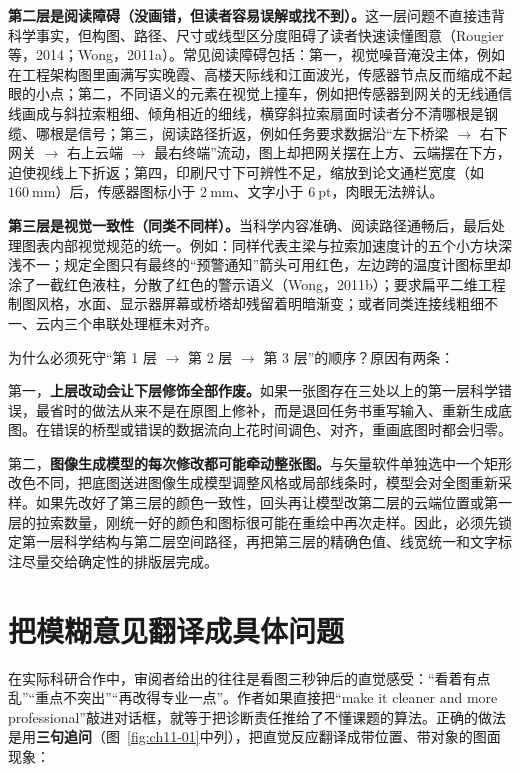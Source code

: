 \textbf{第二层是阅读障碍（没画错，但读者容易误解或找不到）。}这一层问题不直接违背科学事实，但构图、路径、尺寸或线型区分度阻碍了读者快速读懂图意（Rougier 等，2014；Wong，2011a）。常见阅读障碍包括：第一，视觉噪音淹没主体，例如在工程架构图里画满写实晚霞、高楼天际线和江面波光，传感器节点反而缩成不起眼的小点；第二，不同语义的元素在视觉上撞车，例如把传感器到网关的无线通信线画成与斜拉索粗细、倾角相近的细线，横穿斜拉索扇面时读者分不清哪根是钢缆、哪根是信号；第三，阅读路径折返，例如任务要求数据沿“左下桥梁 $\rightarrow$ 右下网关 $\rightarrow$ 右上云端 $\rightarrow$ 最右终端”流动，图上却把网关摆在上方、云端摆在下方，迫使视线上下折返；第四，印刷尺寸下可辨性不足，缩放到论文通栏宽度（如 $160\ \text{mm}$）后，传感器图标小于 $2\ \text{mm}$、文字小于 $6\ \text{pt}$，肉眼无法辨认。

\textbf{第三层是视觉一致性（同类不同样）。}当科学内容准确、阅读路径通畅后，最后处理图表内部视觉规范的统一。例如：同样代表主梁与拉索加速度计的五个小方块深浅不一；规定全图只有最终的“预警通知”箭头可用红色，左边跨的温度计图标里却涂了一截红色液柱，分散了红色的警示语义（Wong，2011b）；要求扁平二维工程制图风格，水面、显示器屏幕或桥塔却残留着明暗渐变；或者同类连接线粗细不一、云内三个串联处理框未对齐。

为什么必须死守“第 1 层 $\rightarrow$ 第 2 层 $\rightarrow$ 第 3 层”的顺序？原因有两条：

第一，\textbf{上层改动会让下层修饰全部作废。}如果一张图存在三处以上的第一层科学错误，最省时的做法从来不是在原图上修补，而是退回任务书重写输入、重新生成底图。在错误的桥型或错误的数据流向上花时间调色、对齐，重画底图时都会归零。

第二，\textbf{图像生成模型的每次修改都可能牵动整张图。}与矢量软件单独选中一个矩形改色不同，把底图送进图像生成模型调整风格或局部线条时，模型会对全图重新采样。如果先改好了第三层的颜色一致性，回头再让模型改第二层的云端位置或第一层的拉索数量，刚统一好的颜色和图标很可能在重绘中再次走样。因此，必须先锁定第一层科学结构与第二层空间路径，再把第三层的精确色值、线宽统一和文字标注尽量交给确定性的排版层完成。

\section{把模糊意见翻译成具体问题}

在实际科研合作中，审阅者给出的往往是看图三秒钟后的直觉感受：“看着有点乱”“重点不突出”“再改得专业一点”。作者如果直接把“make it cleaner and more professional”敲进对话框，就等于把诊断责任推给了不懂课题的算法。正确的做法是用\textbf{三句追问}（图~\ref{fig:ch11-01}中列），把直觉反应翻译成带位置、带对象的图面现象：

